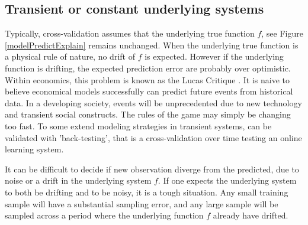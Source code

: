 \subsection{Transient or constant underlying systems}
Typically, cross-validation assumes that the underlying true function $f$, see Figure \ref{modelPredictExplain} remains unchanged. When the underlying true function is a physical rule of nature, no drift of $f$ is expected. However if the underlying function is drifting, the expected prediction error are probably over optimistic. Within economics, this problem is known as the Lucas Critique \cite{wiki:Lucus}. It is naive to believe economical models successfully can predict future events from historical data. In a developing society, events will be unprecedented due to new technology and transient social constructs. The rules of the game may simply be changing too fast. To some extend modeling strategies in transient systems, can be validated with 'back-testing', that is a cross-validation over time testing an online learning system.

It can be difficult to decide if new observation diverge from the predicted, due to noise or a drift in the underlying system $f$. If one expects the underlying system to both be drifting and to be noisy, it is a tough situation. Any small training sample will have a substantial sampling error, and any large sample will be sampled across a period where the underlying function $f$ already have drifted.

